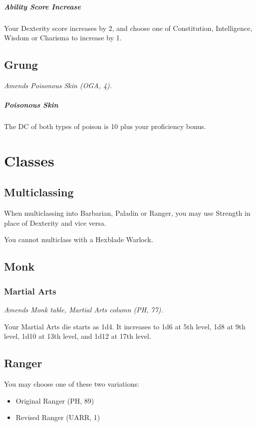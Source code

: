 \documentclass[House_Rules.tex]{subfiles}
\begin{document}
\subparagraph{Ability Score Increase} Your Dexterity score increases by 2, and choose one of Constitution, Intelligence, Wisdom or Charisma to increase by 1.

\subsection{Grung}
\textit{Amends Poisonous Skin (OGA, 4).}

\subparagraph{Poisonous Skin} The DC of both types of poison is 10 plus your proficiency bonus.




\section{Classes}

\subsection{Multiclassing}
When multiclassing into Barbarian, Paladin or Ranger, you may use Strength in place of Dexterity and vice versa.

You cannot multiclass with a Hexblade Warlock.

\subsection{Monk}

\subsubsection{Martial Arts}
\textit{Amends Monk table, Martial Arts column (PH, 77).}

Your Martial Arts die starts as 1d4. It increases to 1d6 at 5th level, 1d8 at 9th level, 1d10 at 13th level, and 1d12 at 17th level.



\subsection{Ranger}

You may choose one of these two variations:

\begin{itemize}
    \item Original Ranger (PH, 89)
    \item Revised Ranger (UARR, 1)

\end{itemize}
\end{document}
